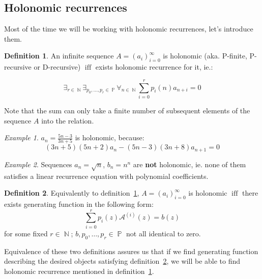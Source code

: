 \documentclass[final]{article}
\theoremstyle{definition}
\newtheorem{definition}{Definition}[subsection]
\theoremstyle{remark}
\newtheorem{example}{Example}[subsection]
\newcommand{\gf}[1]{\ensuremath{\mathcal{#1}}}
\DeclareMathOperator{\textiff}{\text{iff}}
\DeclareMathOperator{\N}{\mathbb{N}}
\DeclareMathOperator{\poly}{\mathbb{P}}
\begin{document}
\subsection{Holonomic recurrences}%
\label{sub:holonomic_recurrences}

Most of the time we will be working with holonomic recurrences, let's introduce them.

\begin{definition}
    \label{def:holo_1}
    \cite{holotoolkit}
    An infinite sequence \(A = (a_i)_{i=0}^{\infty}\) is holonomic (aka. P-finite, P-recursive or D-recursive) \(\textiff\) exists holonomic recurrence for it, ie.:

\[\exists_{r \in \N} \exists_{p_0, \ldots, p_r \in \poly} \forall_{n \in \N} \sum_{i=0}^r p_i(n)a_{n+i} = 0\]
\end{definition}

Note that the sum can only take a finite number of subsequent elements of the sequence \(A\) into the relation.

\begin{example}
    \(a_n = \frac{5n - 3}{3n + 5}\) is holonomic, because:
    \[(3n + 5)(5n + 2) a_n - (5n - 3)(3n + 8) a_{n+1} = 0\]
\end{example}

\begin{example}
    Sequences \(a_n = \sqrt{n}\), \(b_n = n^n\) are \textbf{not} holonomic, ie. none of them satisfies a linear recurrence equation with polynomial coefficients\cite{nonholo}.
\end{example}

\begin{definition}
    \label{def:holo_2}
    \cite{complexity}
    Equivalently to definition\ \ref{def:holo_1}, \(A = (a_i)_{i=0}^{\infty}\) is holonomic \(\textiff\) there exists generating function in the following form:
    \[\sum_{i=0}^{r} p_i(z) \gf{A}^{(i)}(z) = b(z)\]
    for some fixed \(r \in \N\); \(b, p_0, \ldots, p_r \in \poly\) not all identical to zero.
\end{definition}

Equivalence of these two definitions assures us that if we find generating function describing the desired objects satisfying definition\ \ref{def:holo_2}, we will be able to find holonomic recurrence mentioned in definition\ \ref{def:holo_1}.\cite{complexity}
\end{document}
